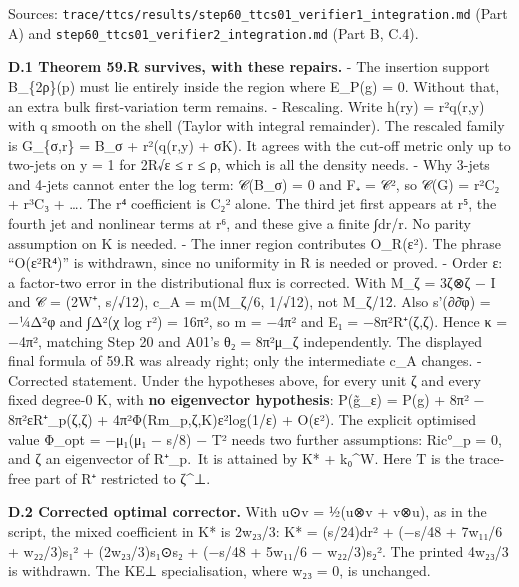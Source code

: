 \documentclass[
  10pt,
]{report}
\begin{document}
Sources:
\texttt{trace/ttcs/results/step60\_ttcs01\_verifier1\_integration.md}
(Part A) and \texttt{step60\_ttcs01\_verifier2\_integration.md} (Part B,
C.4).

\textbf{D.1 Theorem 59.R survives, with these repairs.} - The insertion
support B\_\{2ρ\}(p) must lie entirely inside the region where E\_P(g) =
0. Without that, an extra bulk first-variation term remains. -
Rescaling. Write h(ry) = r²q(r,y) with q smooth on the shell (Taylor
with integral remainder). The rescaled family is G\_\{σ,r\} = B\_σ +
r²(q(r,y) + σK). It agrees with the cut-off metric only up to two-jets
on \textbar y\textbar{} = 1 for 2R√ε ≤ r ≤ ρ, which is all the density
needs. - Why 3-jets and 4-jets cannot enter the log term: 𝒞(B\_σ) = 0
and F₊ = \textbar 𝒞\textbar², so 𝒞(G) = r²C₂ + r³C₃ + \ldots. The r⁴
coefficient is \textbar C₂\textbar² alone. The third jet first appears
at r⁵, the fourth jet and nonlinear terms at r⁶, and these give a finite
∫dr/r. No parity assumption on K is needed. - The inner region
contributes O\_R(ε²). The phrase ``O(ε²R⁴)'' is withdrawn, since no
uniformity in R is needed or proved. - Order ε: a factor-two error in
the distributional flux is corrected. With M\_ζ = 3ζ⊗ζ − I and 𝒞 = (2W⁺,
s/√12), c\_A = m(M\_ζ/6, 1/√12), not M\_ζ/12. Also s'(∂∂̄φ) = −¼Δ²φ and
∫Δ²(χ log r²) = 16π², so m = −4π² and E₁ = −8π²R⁺(ζ,ζ). Hence κ = −4π²,
matching Step 20 and A01's θ₂ = 8π²μ\_ζ independently. The displayed
final formula of 59.R was already right; only the intermediate c\_A
changes. - Corrected statement. Under the hypotheses above, for every
unit ζ and every fixed degree-0 K, with \textbf{no eigenvector
hypothesis}: P(g̃\_ε) = P(g) + 8π² − 8π²εR⁺\_p(ζ,ζ) +
4π²Φ(Rm\_p,ζ,K)ε²log(1/ε) + O(ε²). The explicit optimised value Φ\_opt =
−μ₁(μ₁ − s/8) − \textbar T\textbar² needs two further assumptions:
Ric°\_p = 0, and ζ an eigenvector of R⁺\_p.~It is attained by K* +
k₀\^{}W. Here T is the trace-free part of R⁺ restricted to ζ\^{}⊥.

\textbf{D.2 Corrected optimal corrector.} With u⊙v = ½(u⊗v + v⊗u), as in
the script, the mixed coefficient in K* is 2w₂₃/3: K* = (s/24)dr² +
(−s/48 + 7w₁₁/6 + w₂₂/3)s₁² + (2w₂₃/3)s₁⊙s₂ + (−s/48 + 5w₁₁/6 −
w₂₂/3)s₂². The printed 4w₂₃/3 is withdrawn. The KE⊥ specialisation,
where w₂₃ = 0, is unchanged.
\end{document}
